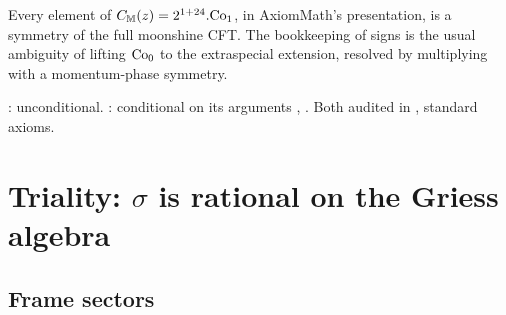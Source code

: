 \begin{physics}
Every element of $C_{\mathbb{M}}(z)=2^{1+24}.\mathrm{Co}_1$, in AxiomMath's presentation, is a symmetry of the full
moonshine CFT.  The bookkeeping of signs is the usual ambiguity of lifting $\mathrm{Co}_0$ to the extraspecial
extension, resolved by multiplying with a momentum-phase symmetry.
\end{physics}
\begin{status}
: unconditional.  : conditional on its arguments ,
.  Both audited in , standard axioms.
\end{status}


\section{Triality: \texorpdfstring{$\sigma$}{sigma} is rational on the Griess algebra}\label{ch22:sec:sigma}

\subsection{Frame sectors}

